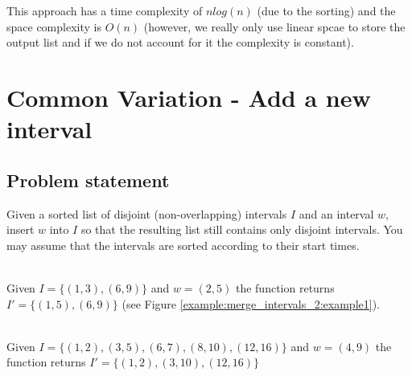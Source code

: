 This approach has a time complexity of $nlog(n)$ (due to the sorting) 
and the space complexity is $O(n)$ (however, we really only use linear spcae to store the output list and if we do not account for it the complexity is constant).

\section{Common Variation - Add a new interval}
\subsection{Problem statement}
\begin{exercise}
\label{example:merge_intervals_2:exercice1_2}
Given a sorted list of disjoint (non-overlapping) intervals $I$ and an interval $w$, insert $w$ into $I$ so that the resulting list still contains only disjoint intervals.
You may assume that the intervals are sorted according to their start times.

	\begin{example}
		\label{example:merge_intervals_2:example1}
		\hfill \\
		Given $I=\{(1,3),(6,9)\}$ and $w=(2,5)$ the function returns $I'=\{(1,5),(6,9)\}$ (see Figure \ref{example:merge_intervals_2:example1}).
	\end{example}

	\begin{example}
		\label{example:merge_intervals_2:example2}
		\hfill \\
		Given $I=\{(1,2),(3,5),(6,7),(8,10),(12,16)\}$ and $w=(4,9)$ the function returns $I'=\{(1,2),(3,10),(12,16)\}$
	\end{example}

\end{exercise}

